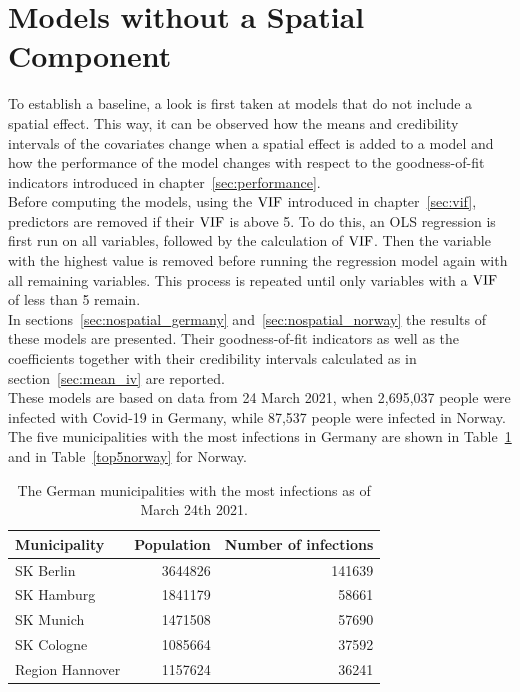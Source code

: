 \section{Models without a Spatial Component}\label{sec:nospatial}
To establish a baseline, a look is first taken at models that do not include a spatial effect. This way, it can be observed how the means and credibility intervals of the covariates change when a spatial effect is added to a model and how the performance of the model changes with respect to the goodness-of-fit indicators introduced in chapter~\ref{sec:performance}. \\
Before computing the models, using the $\hbox{VIF}$ introduced in chapter~\ref{sec:vif}, predictors are removed if their $\hbox{VIF}$ is above 5. To do this, an OLS regression is first run on all variables, followed by the calculation of $\hbox{VIF}$. Then the variable with the highest value is removed before running the regression model again with all remaining variables. This process is repeated until only variables with a $\hbox{VIF}$ of less than 5 remain. \\
In sections~\ref{sec:nospatial_germany} and~\ref{sec:nospatial_norway} the results of these models are presented. Their goodness-of-fit indicators as well as the coefficients together with their credibility intervals calculated as in section~\ref{sec:mean_iv} are reported. \\
These models are based on data from 24 March 2021, when 2,695,037 people were infected with Covid-19 in Germany, while 87,537 people were infected in Norway. The five municipalities with the most infections in Germany are shown in Table~\ref{top5germany} and in Table~\ref{top5norway} for Norway.
\begin{table}[H] 
\caption{The German municipalities with the most infections as of March 24th 2021. \label{top5germany}}
\begin{tabular}{l r r}
\toprule
\textbf{Municipality}	& \textbf{Population}	& \textbf{Number of infections} \\
\midrule
SK Berlin & 3644826 & 141639   \\     
SK Hamburg & 1841179 & 58661   \\
SK Munich & 1471508 & 57690   \\
SK Cologne & 1085664 & 37592   \\
Region Hannover & 1157624 & 36241   \\
\bottomrule
\end{tabular}
\end{table}
